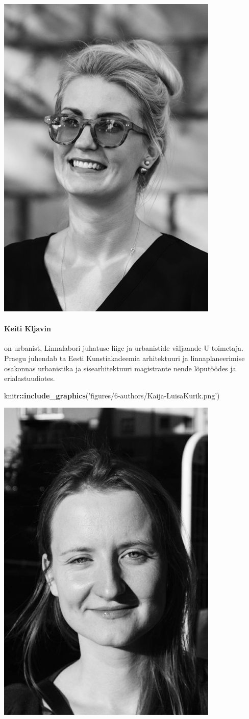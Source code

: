 \documentclass[estonian,]{article}
\newenvironment{Shaded}{\begin{snugshade}}{\end{snugshade}}
\newcommand{\KeywordTok}[1]{\textcolor[rgb]{0.13,0.29,0.53}{\textbf{#1}}}
\newcommand{\NormalTok}[1]{#1}
\newcommand{\OperatorTok}[1]{\textcolor[rgb]{0.81,0.36,0.00}{\textbf{#1}}}
\newcommand{\StringTok}[1]{\textcolor[rgb]{0.31,0.60,0.02}{#1}}
\let\oldparagraph\paragraph
\renewcommand{\paragraph}[1]{\oldparagraph{#1}\mbox{}}
\begin{document}
\begin{flushleft}\includegraphics[width=0.5\linewidth]{figures/6-authors/KeitiKljavin} \end{flushleft}

\hypertarget{keiti-kljavin}{%
\paragraph{Keiti Kljavin}\label{keiti-kljavin}}

on urbanist, Linnalabori juhatuse liige ja urbanistide väljaande U toimetaja. Praegu juhendab ta Eesti Kunstiakadeemia arhitektuuri ja linnaplaneerimise osakonnas urbanistika ja sisearhitektuuri magistrante nende lõputöödes ja erialastuudiotes.

\begin{Shaded}
\begin{Highlighting}[]
\NormalTok{knitr}\OperatorTok{::}\KeywordTok{include_graphics}\NormalTok{(}\StringTok{'figures/6-authors/Kaija-LuisaKurik.png'}\NormalTok{)}
\end{Highlighting}
\end{Shaded}

\begin{flushleft}\includegraphics[width=0.5\linewidth]{figures/6-authors/Kaija-LuisaKurik} \end{flushleft}
\end{document}
